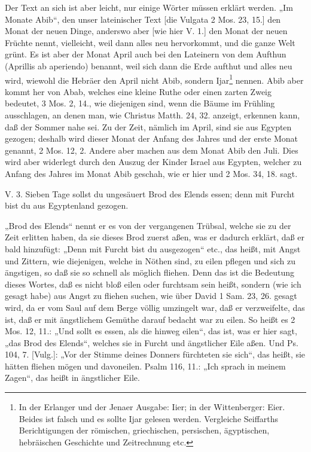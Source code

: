 Der Text an sich ist aber leicht, nur einige Wörter müssen erklärt werden. „Im Monate Abib“, den unser lateinischer Text [die Vulgata 2 Mos. 23, 15.] den Monat der neuen Dinge, anderswo aber [wie hier V. 1.] den Monat der neuen Früchte nennt, vielleicht, weil dann alles neu hervorkommt, und die ganze Welt grünt. Es ist aber der Monat April auch bei den Lateinern von dem Aufthun (Aprillis ab aperiendo) benannt, weil sich dann die Erde aufthut und alles neu wird, wiewohl die Hebräer den April nicht Abib, sondern Ijar\footnote{In der Erlanger und der Jenaer Ausgabe: Iier; in der Wittenberger: Eier. Beides ist falsch und es sollte Ijar gelesen werden. Vergleiche Seiffarths Berichtigungen der römischen, griechischen, persischen, ägyptischen, hebräischen Geschichte und Zeitrechnung etc.} nennen. Abib aber kommt her von Abab, welches eine kleine Ruthe oder einen zarten Zweig bedeutet, 3 Mos. 2, 14., wie diejenigen sind, wenn die Bäume im Frühling ausschlagen, an denen man, wie Christus Matth. 24, 32. anzeigt, erkennen kann, daß der Sommer nahe sei. Zu der Zeit, nämlich im April, sind sie aus Egypten gezogen; deshalb wird dieser Monat der Anfang des Jahres und der erste Monat genannt, 2 Mos. 12, 2. Andere aber machen aus dem Monat Abib den Juli. Dies wird aber widerlegt durch den Auszug der
Kinder Israel aus Egypten, welcher zu Anfang des Jahres im Monat Abib geschah, wie er hier und 2 Mos. 34, 18. sagt.

\begin{schriftzitat}
V. 3. Sieben Tage sollst du ungesäuert Brod des Elends essen; denn mit Furcht bist du aus Egyptenland gezogen.
\end{schriftzitat}

„Brod des Elends“ nennt er es von der vergangenen Trübsal, welche sie zu der Zeit erlitten haben, da sie dieses Brod zuerst aßen, was er dadurch erklärt, daß er bald hinzufügt: „Denn mit Furcht bist du ausgezogen“ etc., das heißt, mit Angst und Zittern, wie diejenigen, welche in Nöthen sind, zu eilen pflegen und sich zu ängstigen, so daß sie so schnell als möglich fliehen. Denn das ist die Bedeutung dieses Wortes, daß es nicht bloß eilen oder furchtsam sein heißt, sondern (wie ich gesagt habe) aus Angst zu fliehen suchen, wie über David 1 Sam. 23, 26. gesagt wird, da er vom Saul auf dem Berge völlig umzingelt war, daß er verzweifelte, das ist, daß er mit ängstlichem Gemüthe darauf bedacht war zu eilen. So heißt es 2 Mos. 12, 11.: „Und sollt es essen, als die hinweg eilen“, das ist, was er hier sagt, „das Brod des Elends“, welches sie in Furcht und ängstlicher Eile aßen. Und Ps. 104, 7. [Vulg.]: „Vor der Stimme deines Donners fürchteten sie sich“, das heißt, sie hätten fliehen mögen und davoneilen. Psalm 116, 11.: „Ich sprach in meinem Zagen“, das heißt in ängstlicher Eile.

